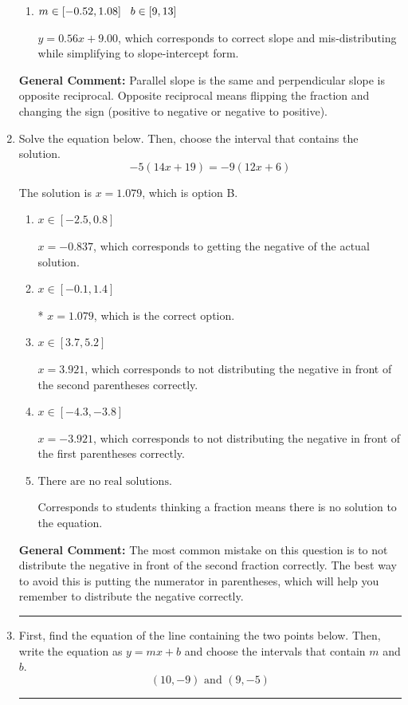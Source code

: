 \documentclass{extbook}[14pt]
\newcommand{\litem}[1]{\item #1

\rule{\textwidth}{0.4pt}}
\begin{document}
\begin{enumerate}
{\begin{enumerate}[label=\Alph*.]
 $y = -0.56x + 2.78$, which corresponds to using the negative slope.
\item \( m \in [-0.52, 1.08] \hspace*{3mm} b \in [9, 13] \)

 $y = 0.56x + 9.00$, which corresponds to correct slope and mis-distributing while simplifying to slope-intercept form.
\end{enumerate}

\textbf{General Comment:} Parallel slope is the same and perpendicular slope is opposite reciprocal. Opposite reciprocal means flipping the fraction and changing the sign (positive to negative or negative to positive).
}
\litem{
Solve the equation below. Then, choose the interval that contains the solution.
\[ -5(14x + 19) = -9(12x + 6) \]

The solution is \( x = 1.079 \), which is option B.\begin{enumerate}[label=\Alph*.]
\item \( x \in [-2.5, 0.8] \)

$x = -0.837$, which corresponds to getting the negative of the actual solution.
\item \( x \in [-0.1, 1.4] \)

* $x = 1.079$, which is the correct option.
\item \( x \in [3.7, 5.2] \)

$x = 3.921$, which corresponds to not distributing the negative in front of the second parentheses correctly.
\item \( x \in [-4.3, -3.8] \)

$x = -3.921$, which corresponds to not distributing the negative in front of the first parentheses correctly.
\item \( \text{There are no real solutions.} \)

Corresponds to students thinking a fraction means there is no solution to the equation.
\end{enumerate}

\textbf{General Comment:} The most common mistake on this question is to not distribute the negative in front of the second fraction correctly. The best way to avoid this is putting the numerator in parentheses, which will help you remember to distribute the negative correctly.
}
\litem{
First, find the equation of the line containing the two points below. Then, write the equation as $ y=mx+b $ and choose the intervals that contain $m$ and $b$.
\[ (10, -9) \text{ and } (9, -5) \]

}
\end{enumerate}
\end{document}
